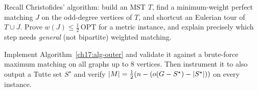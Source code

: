\begin{exercise}
\label{ch17:ex-christofides}
Recall Christofides' algorithm: build an MST $T$, find a minimum-weight perfect matching $J$ on the
odd-degree vertices of $T$, and shortcut an Eulerian tour of $T\cup J$. Prove $w(J)\le\tfrac12
\,\mathrm{OPT}$ for a metric instance, and explain precisely which step needs \emph{general} (not
bipartite) weighted matching.
\end{exercise}

\begin{exercise}
\label{ch17:ex-implement}
Implement Algorithm~\ref{ch17:alg-outer} and validate it against a brute-force maximum matching on all
graphs up to $8$ vertices. Then instrument it to also output a Tutte set $S^{\star}$ and verify
$\lvert M\rvert=\tfrac12(n-(o(G-S^{\star})-\lvert S^{\star}\rvert))$ on every instance.
\end{exercise}
